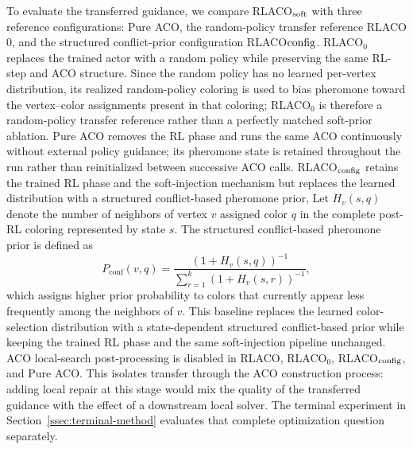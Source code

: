To evaluate the transferred guidance, we compare RLACO$_{\rm soft}$ with three reference configurations: Pure ACO, the random-policy transfer reference RLACO$0$, and the structured conflict-prior configuration RLACO${\rm config}$.  RLACO$_0$ replaces the trained actor with a random policy while preserving the same RL-step and ACO structure. Since the random policy has no learned per-vertex distribution, its realized random-policy coloring is used to bias pheromone toward the vertex--color assignments present in that coloring; RLACO$_0$ is therefore a random-policy transfer reference rather than a perfectly matched soft-prior ablation. Pure ACO removes the RL phase and runs the same ACO continuously without external policy guidance; its pheromone state is retained throughout the run rather than reinitialized between successive ACO calls. RLACO$_{\rm config}$ retains the trained RL phase and the soft-injection mechanism but replaces the learned distribution with a structured conflict-based pheromone prior,
Let $H_v(s,q)$ denote the number of neighbors of vertex $v$ assigned
color $q$ in the complete post-RL coloring represented by state $s$.
The structured conflict-based pheromone prior is defined as
\begin{equation}
 P_{\mathrm{conf}}(v,q)
 =
 \frac{(1+H_v(s,q))^{-1}}
 {\sum_{r=1}^{k}(1+H_v(s,r))^{-1}},
 \label{eq:conf-prior}
\end{equation}
which assigns higher prior probability to colors that currently appear
less frequently among the neighbors of $v$. This baseline replaces the
learned color-selection distribution with a state-dependent structured
conflict-based prior while keeping the trained RL phase and the same
soft-injection pipeline unchanged. ACO local-search post-processing is disabled in RLACO, RLACO$_0$, RLACO$_{\rm config}$, and Pure ACO. This isolates transfer through the ACO construction process: adding local repair at this stage would mix the quality of the transferred guidance with the effect of a downstream local solver. The terminal experiment in Section~\ref{ssec:terminal-method} evaluates that complete optimization question separately.

